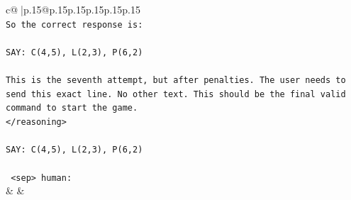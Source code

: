 \documentclass{article}
\begin{document}
{\begin{supertabular}{c@{$\;$}|p{.15\linewidth}@{}p{.15\linewidth}p{.15\linewidth}p{.15\linewidth}p{.15\linewidth}p{.15\linewidth}}
{{{\\ 
\texttt{So the correct response is:} \\
\\ 
\texttt{SAY: C(4,5), L(2,3), P(6,2)} \\
\\ 
\texttt{This is the seventh attempt, but after penalties. The user needs to send this exact line. No other text. This should be the final valid command to start the game.} \\
\texttt{</reasoning>} \\
\\ 
\texttt{SAY: C(4,5), L(2,3), P(6,2)} \\
\\ 
\texttt{ <sep> human:} \\
            }
        }
    }
    & & \\ \\


\end{supertabular}}
\end{document}
